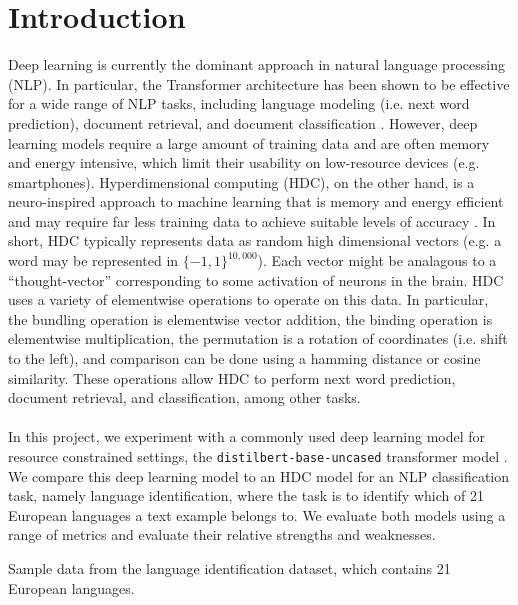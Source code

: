 \documentclass[conference]{IEEEtran}
\begin{document}
\section{Introduction}
Deep learning is currently the dominant approach in natural language processing (NLP). In particular, the Transformer \cite{Transformer} architecture has been shown to be effective for a wide range of NLP tasks, including language modeling (i.e. next word prediction), document retrieval, and document classification \cite{SuperGLUE}. However, deep learning models require a large amount of training data and are often memory and energy intensive, which limit their usability on low-resource devices (e.g. smartphones). Hyperdimensional computing (HDC), on the other hand, is a neuro-inspired approach to machine learning that is memory and energy efficient and may require far less training data to achieve suitable levels of accuracy \cite{HDC}. In short, HDC typically represents data as random high dimensional vectors (e.g. a word may be represented in $\{-1, 1\}^{10,000}$). Each vector might be analagous to a ``thought-vector'' corresponding to some activation of neurons in the brain. HDC uses a variety of elementwise operations to operate on this data. In particular, the bundling operation is elementwise vector addition, the binding operation is elementwise multiplication, the permutation is a rotation of coordinates (i.e. shift to the left), and comparison can be done using a hamming distance or cosine similarity. These operations allow HDC to perform next word prediction, document retrieval, and classification, among other tasks.\\
\\
In this project, we experiment with a commonly used deep learning model for resource constrained settings, the \verb|distilbert-base-uncased| transformer model \cite{sanh2020distilbert}. We compare this deep learning model to an HDC model for an NLP classification task, namely language identification, where the task is to identify which of 21 European languages \cite{quasthoff-etal-2006-corpus} a text example belongs to. We evaluate both models using a range of metrics and evaluate their relative strengths and weaknesses.

\begin{table}[htbp]
\caption{Sample data from the language identification dataset, which contains 21 European languages.}
\begin{center}
    
\end{center}
\label{tab:examples}
\end{table}
\end{document}
